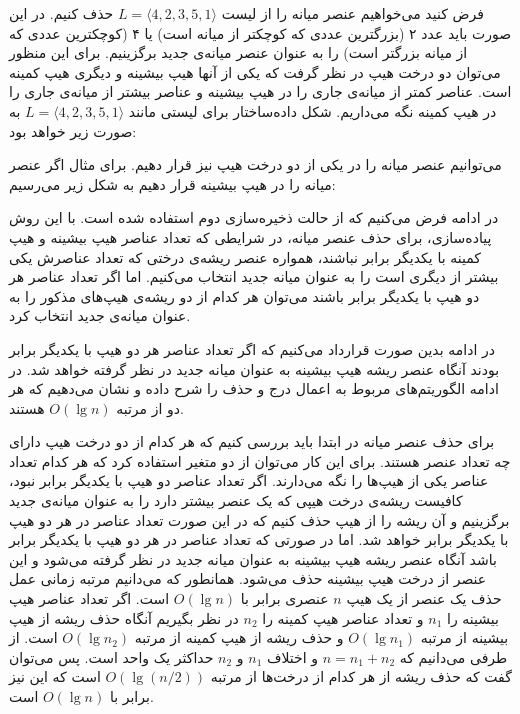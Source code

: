فرض کنید می‌خواهیم عنصر میانه را از لیست {$L=\langle 4,2,3,5,1 \rangle$} حذف کنیم. در این صورت باید عدد ۲ (بزرگترین عددی که کوچکتر از میانه است) یا ۴ (کوچکترین عددی که از میانه بزرگتر است) را به عنوان عنصر میانه‌ی جدید برگزینیم. برای این منظور می‌توان دو درخت هیپ در نظر گرفت که یکی از آنها هیپ بیشینه و دیگری هیپ کمینه است. عناصر کمتر از میانه‌ی جاری را در هیپ بیشینه و عناصر بیشتر از میانه‌ی جاری را در هیپ کمینه نگه می‌داریم. شکل داده‌ساختار برای لیستی مانند {$L=\langle 4,2,3,5,1 \rangle$} به صورت زیر خواهد بود:

می‌توانیم عنصر میانه را در یکی از دو درخت هیپ نیز قرار دهیم. برای مثال اگر عنصر میانه را در هیپ بیشینه قرار دهیم به شکل زیر می‌رسیم:

در ادامه فرض می‌کنیم که از حالت ذخیره‌سازی دوم استفاده شده است. با این روش پیاده‌سازی، برای حذف عنصر میانه، در شرایطی که تعداد عناصر هیپ بیشینه و هیپ کمینه با یکدیگر برابر نباشند، همواره عنصر ریشه‌ی درختی که تعداد عناصرش یکی بیشتر از دیگری است را به عنوان میانه جدید انتخاب می‌کنیم. اما اگر تعداد عناصر هر دو هیپ با یکدیگر برابر باشند می‌توان هر کدام از دو ریشه‌ی هیپ‌های مذکور را به عنوان میانه‌ی جدید انتخاب کرد. 

در ادامه بدین صورت قرارداد می‌کنیم که اگر تعداد عناصر هر دو هیپ با یکدیگر برابر بودند آنگاه عنصر ریشه هیپ بیشینه به عنوان میانه جدید در نظر گرفته خواهد شد. در ادامه الگوریتم‌های مربوط به اعمال درج و حذف را شرح داده و نشان می‌دهیم که هر دو از مرتبه {$O(\lg n)$} هستند.

برای حذف عنصر میانه در ابتدا باید بررسی کنیم که هر کدام از دو درخت هیپ‌ دارای چه تعداد عنصر هستند. برای این کار می‌توان از دو متغیر استفاده کرد که هر کدام تعداد عناصر یکی از هیپ‌ها را نگه می‌دارند. اگر تعداد عناصر دو هیپ‌ با یکدیگر برابر نبود، کافیست ریشه‌ی درخت هیپی که یک عنصر بیشتر دارد را به عنوان  میانه‌ی جدید برگزینیم و آن ریشه را از هیپ حذف کنیم که در این صورت تعداد عناصر در هر دو هیپ با یکدیگر برابر خواهد شد. اما در صورتی که تعداد عناصر در هر دو هیپ با یکدیگر برابر باشد آنگاه عنصر ریشه هیپ بیشینه به عنوان میانه جدید در نظر گرفته می‌شود و این عنصر از درخت هیپ بیشینه حذف می‌شود. همانطور که می‌دانیم مرتبه زمانی عمل حذف یک عنصر از یک هیپ {$n$} عنصری برابر با {$O(\lg n)$} است. اگر تعداد عناصر هیپ بیشینه را {$n_1$} و تعداد عناصر هیپ کمینه را {$n_2$} در نظر بگیریم آنگاه حذف ریشه از هیپ بیشینه از مرتبه {$O(\lg n_1)$} و حذف ریشه از هیپ کمینه از مرتبه‌ {$O(\lg n_2)$} است. از طرفی می‌دانیم که {$n=n_1+n_2$} و  اختلاف {$n_1$} و {$n_2$} حداکثر یک واحد است. پس می‌توان گفت که حذف ریشه از هر کدام از درخت‌ها از مرتبه {$O(\lg (n/2))$} است که این نیز برابر با {$O(\lg n)$} است.


